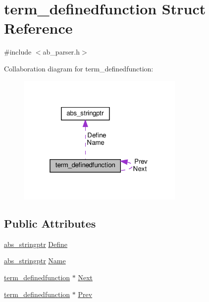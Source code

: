 \hypertarget{structterm__definedfunction}{}\section{term\+\_\+definedfunction Struct Reference}
\label{structterm__definedfunction}


{\ttfamily \#include $<$ab\+\_\+parser.\+h$>$}



Collaboration diagram for term\+\_\+definedfunction\+:\nopagebreak
\begin{figure}[H]
\begin{center}
\leavevmode
\includegraphics[width=229pt]{df/da2/structterm__definedfunction__coll__graph}
\end{center}
\end{figure}
\subsection*{Public Attributes}
\begin{DoxyCompactItemize}
\item 
\hyperlink{structabs__stringptr}{abs\+\_\+stringptr} \hyperlink{structterm__definedfunction_aa78ae899d76ca4b6baf02f8150a0ed24}{Define}
\item 
\hyperlink{structabs__stringptr}{abs\+\_\+stringptr} \hyperlink{structterm__definedfunction_af6b99d4f43bb09f5d3340448e0daa489}{Name}
\item 
\hyperlink{structterm__definedfunction}{term\+\_\+definedfunction} $\ast$ \hyperlink{structterm__definedfunction_ae4d62f23998fa05c8b5e4e900980460c}{Next}
\item 
\hyperlink{structterm__definedfunction}{term\+\_\+definedfunction} $\ast$ \hyperlink{structterm__definedfunction_a8f3ed1e8ae1fa3012452929ca8cb0da3}{Prev}
\end{DoxyCompactItemize}


